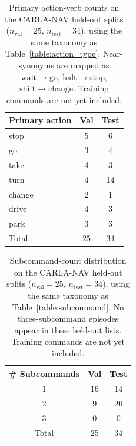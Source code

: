\begin{table}[ht]
\begin{center}
\begin{tabular}{|l|c|c|}
\hline
Primary action & Val & Test \\ \hline
stop & 5 & 6 \\ \hline
go & 3 & 4 \\ \hline
take & 4 & 3 \\ \hline
turn & 4 & 14 \\ \hline
change & 2 & 1 \\ \hline
drive & 4 & 3 \\ \hline
park & 3 & 3 \\ \hline
Total & 25 & 34 \\ \hline
\end{tabular}
\end{center}
\caption[Held-out action-verb counts]{Primary action-verb counts on the CARLA-NAV held-out splits ($n_{\mathrm{val}}=25$, $n_{\mathrm{test}}=34$), using the same taxonomy as Table~\ref{table:action_type}. Near-synonyms are mapped as $\mathrm{wait}\!\to\!\mathrm{go}$, $\mathrm{halt}\!\to\!\mathrm{stop}$, $\mathrm{shift}\!\to\!\mathrm{change}$. Training commands are not yet included.}
\label{table:heldout_action}
\end{table}

\begin{table}[ht]
\begin{center}
\begin{tabular}{|c|c|c|}
\hline
\# Subcommands & Val & Test \\ \hline
1 & 16 & 14 \\ \hline
2 & 9 & 20 \\ \hline
3 & 0 & 0 \\ \hline
Total & 25 & 34 \\ \hline
\end{tabular}
\end{center}
\caption[Held-out subcommand-count]{Subcommand-count distribution on the CARLA-NAV held-out splits ($n_{\mathrm{val}}=25$, $n_{\mathrm{test}}=34$), using the same taxonomy as Table~\ref{table:subcommand}. No three-subcommand episodes appear in these held-out lists. Training commands are not yet included.}
\label{table:heldout_subcommand}
\end{table}


